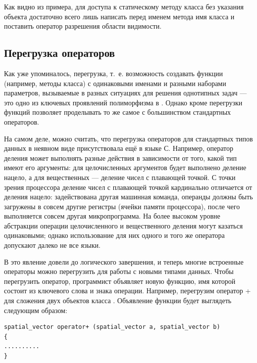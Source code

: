 Как видно из примера, для доступа к статическому методу класса без указания объекта достаточно всего лишь написать перед
именем метода имя класса и поставить оператор разрешения области видимости.

\subsection[Перегрузка операторов ]{Перегрузка операторов}\label{ch10:1.7}
Как уже упоминалось, перегрузка, т.~е. возможность создавать функции (например,
методы класса) с одинаковыми именами и разными наборами параметров, вызываемые в разных ситуациях для решения
однотипных задач --- это одно из ключевых проявлений полиморфизма в . Однако кроме перегрузки функций  позволяет
проделывать то же самое с большинством стандартных операторов.

На самом деле, можно считать, что перегрузка операторов для стандартных типов данных в
неявном виде присутствовала ещё в языке С. Например, оператор деления может выполнять разные действия в зависимости от
того, какой тип имеют его аргументы: для целочисленных аргументов будет выполнено деление нацело, а для вещественных ---
деление чисел с плавающей точкой. С точки зрения процессора деление чисел с плавающей точкой кардинально отличается от
деления нацело: задействована другая машинная команда, операнды должны быть загружены в совсем другие регистры (ячейки
памяти  процессора), после чего выполняется совсем другая микропрограмма. На более высоком уровне абстракции операции
целочисленного и вещественного деления могут казаться одинаковыми; однако использование для них одного и того же
оператора допускают далеко не все языки.

В  это явление довели до логического завершения, и теперь многие встроенные операторы можно
перегрузить для работы с новыми типами данных. Чтобы перегрузить оператор, программист объявляет новую функцию, имя
которой состоит из ключевого слова  и знака операции. Например,
перегрузим оператор + для сложения двух объектов класса
. Объявление функции будет выглядеть
следующим образом:
\begin{lstlisting}
spatial_vector operator+ (spatial_vector a, spatial_vector b) 
{
..........
}
\end{lstlisting}

